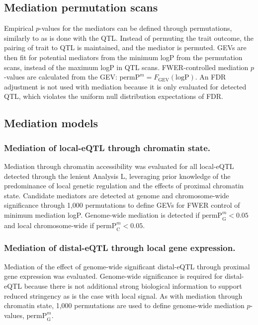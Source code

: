 \documentclass[10pt,letterpaper,twoside]{article}
\newcommand{\permpmed}{\text{permP}^{m}}
\begin{document}
\subsection*{Mediation permutation scans}

Empirical $p$-values for the mediators can be defined through permutations, similarly to as is done with the QTL. Instead of permuting the trait outcome, the pairing of trait to QTL is maintained, and the mediator is permuted. GEVs are then fit for potential mediators from the minimum logP from the permutation scans, instead of the maximum logP in QTL scans. FWER-controlled mediation $p$-values are calculated from the GEV: $\permpmed = F_{\text{GEV}}(\text{logP})$. An FDR adjustment is not used with mediation because it is only evaluated for detected QTL, which violates the uniform null distribution expectations of FDR.

\subsection*{Mediation models}

\subsubsection*{Mediation of local-eQTL through chromatin state.}
Mediation through chromatin accessibility was evaluated for all local-eQTL detected through the lenient Analysis L, leveraging prior knowledge of the predominance of local genetic regulation and the effects of proximal chromatin state. Candidate mediators are detected at genome and chromosome-wide significance through 1,000 permutations to define GEVs for FWER control of minimum mediation logP. Genome-wide mediation is detected if $\permpmed_{\text{G}} < 0.05$ and local chromosome-wide if $\permpmed_{\text{C}} < 0.05$. 

\subsubsection*{Mediation of distal-eQTL through local gene expression.}
Mediation of the effect of genome-wide significant distal-eQTL through proximal gene expression was evaluated. Genome-wide significance is required for distal-eQTL because there is not additional strong biological information to support reduced stringency as is the case with local signal. As with mediation through chromatin state, 1,000 permutations are used to define genome-wide mediation $p$-values, $\permpmed_{\text{G}}$. 
\end{document}
